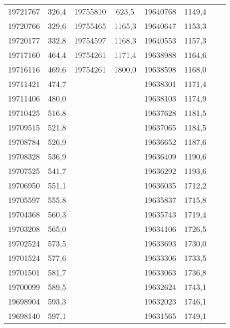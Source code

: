 \documentclass[11pt]{article}
\begin{document}
{{\begin{tabular}{|c|c|cc|c|c|cc}
            \cline{1-6} 
            19721767 & 326,4 & \multicolumn{1}{c|}{19755810} & 623,5 & 19640768 & 1149,4 &  & \tabularnewline
            \cline{1-6} 
            19720766 & 329,6 & \multicolumn{1}{c|}{19755465} & 1165,3 & 19640647 & 1153,3 &  & \tabularnewline
            \cline{1-6} 
            19720177 & 332,8 & \multicolumn{1}{c|}{19754597} & 1168,3 & 19640553 & 1157,3 &  & \tabularnewline
            \cline{1-6} 
            19717160 & 464,4 & \multicolumn{1}{c|}{19754261} & 1171,4 & 19638988 & 1164,6 &  & \tabularnewline
            \cline{1-6} 
            19716116 & 469,6 & \multicolumn{1}{c|}{19754261} & 1800,0 & 19638598 & 1168,0 &  & \tabularnewline
            \cline{1-6} 
            19711421 & 474,7 &  &  & 19638301 & 1171,4 &  & \tabularnewline
            \cline{1-2} \cline{5-6} 
            19711406 & 480,0 &  &  & 19638103 & 1174,9 &  & \tabularnewline
            \cline{1-2} \cline{5-6} 
            19710425 & 516,8 &  &  & 19637628 & 1181,5 &  & \tabularnewline
            \cline{1-2} \cline{5-6} 
            19709515 & 521,8 &  &  & 19637065 & 1184,5 &  & \tabularnewline
            \cline{1-2} \cline{5-6} 
            19708784 & 526,9 &  &  & 19636652 & 1187,6 &  & \tabularnewline
            \cline{1-2} \cline{5-6} 
            19708328 & 536,9 &  &  & 19636409 & 1190,6 &  & \tabularnewline
            \cline{1-2} \cline{5-6} 
            19707525 & 541,7 &  &  & 19636292 & 1193,6 &  & \tabularnewline
            \cline{1-2} \cline{5-6} 
            19706950 & 551,1 &  &  & 19636035 & 1712,2 &  & \tabularnewline
            \cline{1-2} \cline{5-6} 
            19705597 & 555,8 &  &  & 19635837 & 1715,8 &  & \tabularnewline
            \cline{1-2} \cline{5-6} 
            19704368 & 560,3 &  &  & 19635743 & 1719,4 &  & \tabularnewline
            \cline{1-2} \cline{5-6} 
            19703208 & 565,0 &  &  & 19634106 & 1726,5 &  & \tabularnewline
            \cline{1-2} \cline{5-6} 
            19702524 & 573,5 &  &  & 19633693 & 1730,0 &  & \tabularnewline
            \cline{1-2} \cline{5-6} 
            19701524 & 577,6 &  &  & 19633306 & 1733,5 &  & \tabularnewline
            \cline{1-2} \cline{5-6} 
            19701501 & 581,7 &  &  & 19633063 & 1736,8 &  & \tabularnewline
            \cline{1-2} \cline{5-6} 
            19700099 & 589,5 &  &  & 19632624 & 1743,1 &  & \tabularnewline
            \cline{1-2} \cline{5-6} 
            19698904 & 593,3 &  &  & 19632023 & 1746,1 &  & \tabularnewline
            \cline{1-2} \cline{5-6} 
            19698140 & 597,1 &  &  & 19631565 & 1749,1 &  & \tabularnewline
            \cline{1-2} \cline{5-6} 

\end{tabular}}}
\end{document}
